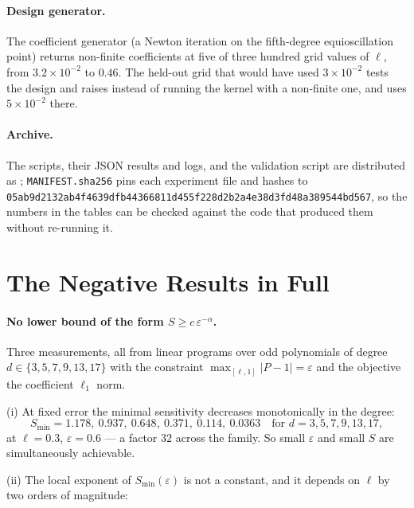 \paragraph{Design generator.}
The coefficient generator (a Newton iteration on the fifth-degree equioscillation point)
returns non-finite coefficients at five of three hundred grid values of $\ell$, from
$3.2\times10^{-2}$ to $0.46$.  The held-out grid that would have used $3\times10^{-2}$
tests the design and raises instead of running the kernel with a non-finite one, and uses
$5\times10^{-2}$ there.

\paragraph{Archive.}
The scripts, their JSON results and logs, and the validation script are distributed as
; \texttt{MANIFEST.sha256} pins each experiment file
and hashes to \texttt{05ab9d2132ab4f46}\allowbreak\texttt{39dfb44366811d45}\allowbreak\texttt{5f228d2b2a4e38d3}\allowbreak\texttt{fd48a389544bd567}, so the numbers in the tables can be checked
against the code that produced them without re-running it.

\section{The Negative Results in Full}
\label{app:refute}

\paragraph{No lower bound of the form $S\ge c\,\varepsilon^{-\alpha}$.}
Three measurements, all from linear programs over odd polynomials of degree
$d\in\{3,5,7,9,13,17\}$ with the constraint $\max_{[\ell,1]}|P-1|=\varepsilon$ and
the objective the coefficient $\ell_1$ norm.

(i) At fixed error the minimal sensitivity decreases monotonically in the degree:
\[ S_{\min} = 1.178,\ 0.937,\ 0.648,\ 0.371,\ 0.114,\ 0.0363
   \quad \text{for } d = 3,5,7,9,13,17, \]
at $\ell=0.3$, $\varepsilon=0.6$ --- a factor $32$ across the
family.  So small $\varepsilon$ and small $S$ are simultaneously achievable.

(ii) The local exponent of $S_{\min}(\varepsilon)$ is not a constant, and it depends
on $\ell$ by two orders of magnitude:

